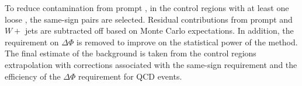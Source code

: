 To reduce contamination from prompt \tauTau, in the control regions with at least one loose \Tau, 
the same-sign pairs are selected.  Residual contributions from prompt
\tauTau and $W+$ jets are subtracted off based on Monte Carlo expectations.
In addition, the requirement on $\Delta \Phi$
is removed to improve on the statistical power of the method. 
The final estimate of the background
is taken from the control regions extrapolation with corrections
associated with the same-sign requirement and the efficiency of 
the $\Delta \Phi$ requirement for QCD events.





